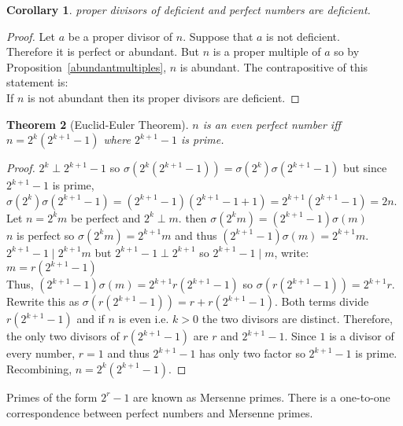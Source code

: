 \documentclass[12pt]{extarticle}
\renewcommand\qedsymbol{$\square$}
\newcommand{\divides}{\mid}
\newtheorem{theorem}{Theorem}[section]
\newtheorem{corollary}[theorem]{Corollary}
\newenvironment{lproof}{\begin{proof} \renewcommand{\qedsymbol}{}}{\end{proof}}
\begin{document}
\begin{corollary}
proper divisors of deficient and perfect numbers are deficient.  
\end{corollary}

\begin{lproof}
Let $a$ be a proper divisor of $n$. Suppose that $a$ is not deficient. \\ Therefore it is perfect or abundant. But $n$ is a proper multiple of $a$ so by Proposition~\ref{abundantmultiples}, $n$ is abundant. The contrapositive of this statement is: \\
If $n$ is not abundant then its proper divisors are deficient. 
\end{lproof}

\begin{theorem}[Euclid-Euler Theorem]
$n$ is an even perfect number iff \\ $n = 2^{k}(2^{k+1}-1)$ where $2^{k+1}-1$ is prime.
\end{theorem}

\begin{proof}
$2^k \perp 2^{k+1}-1$ so
$\sigma (2^{k}(2^{k+1}-1)) = \sigma (2^k)   \sigma (2^{k+1}-1)$ but since $2^{k+1} - 1$ is prime, $\sigma (2^k)   \sigma (2^{k+1}-1)  = (2^{k+1} - 1)   (2^{k+1} - 1 + 1) = 2^{k+1} (2^{k+1} - 1) = 2n$.\\

\noindent Let $n = 2^km$ be perfect and $2^k \perp m$. then $\sigma (2^km) = (2^{k+1} - 1)   \sigma (m)$ \\
$n$ is perfect so $\sigma(2^km) = 2^{k+1}m$ and thus $(2^{k+1} - 1)   \sigma (m) = 2^{k+1}m$. \\
$2^{k+1} - 1 \divides 2^{k+1}m$ but $2^{k+1} - 1 \perp 2^{k+1}$ so $2^{k+1} - 1 \divides m$, write: $m = r(2^{k+1} - 1)$ \\
Thus, $(2^{k+1} - 1)   \sigma (m) = 2^{k+1}r(2^{k+1} - 1)$ so $\sigma (r(2^{k+1} - 1)) = 2^{k+1}r$. \\
Rewrite this as $\sigma (r   (2^{k+1} - 1)) = r + r   (2^{k+1}-1)$. Both terms divide $r   (2^{k+1} - 1)$ and if $n$ is even i.e. $k > 0$ the two divisors are distinct. Therefore, the only two divisors of $r   (2^{k+1} - 1)$ are $r$ and $2^{k+1} - 1$. Since $1$ is a divisor of every number, $r = 1$ and thus $2^{k+1} - 1$ has only two factor so $2^{k+1} - 1$ is prime. 
Recombining, $n = 2^k   (2^{k+1} - 1)$.
\end{proof}

\noindent Primes of the form $2^{r} -1$ are known as Mersenne primes. There is a one-to-one correspondence between perfect numbers and Mersenne primes.
\end{document}
